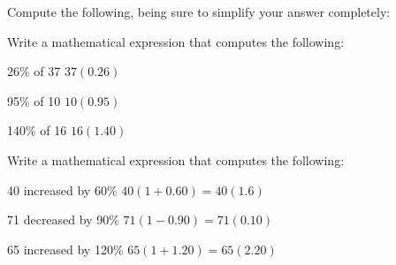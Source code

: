 \documentclass[12pt,letterpaper]{exam}
\begin{document}
\begin{questions}



\newpage



\question[8] Compute the following, being sure to simplify your answer completely: \pspace
{}



\newpage



\question[6] Write a mathematical expression that computes the following: \pspace
\begin{parts}
\item 26\% of 37 \hspace{3cm} $37(0.26)$ \vfill
\item 95\% of 10 \hspace{2.95cm} $10(0.95)$ \vfill
\item 140\% of 16 \hspace{2.75cm} $16(1.40)$ \vfill
\end{parts} \vfill



\question[6] Write a mathematical expression that computes the following: \pspace
\begin{parts}
\item 40 increased by 60\% \hspace{3cm} $40(1 + 0.60)= 40(1.6)$ \vfill
\item 71 decreased by 90\% \hspace{3cm} $71(1 - 0.90)= 71(0.10)$ \vfill
\item 65 increased by 120\% \hspace{3cm} $65(1 + 1.20)= 65(2.20)$ \vfill
\end{parts}




\end{questions}
\end{document}
